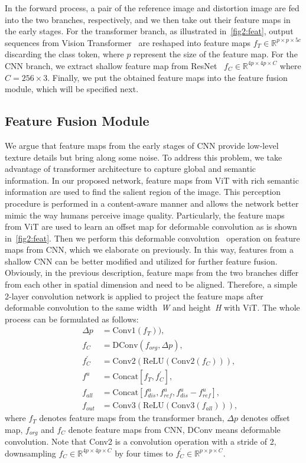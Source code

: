 \documentclass[10pt,twocolumn,letterpaper]{article}
\begin{document}
In the forward process, a pair of the reference image and distortion image are fed into the two branches, respectively, and we then take out their feature maps in the early stages. For the transformer branch, as illustrated in~\cref{fig2:feat}, output sequences from Vision Transformer~\cite{dosovitskiy2020image} are reshaped into feature maps $f_{T}\in \mathbb{R}^{p\times p \times 5c}$ discarding the class token, where $p$ represent the size of the feature map. For the CNN branch, we extract shallow feature map from ResNet~\cite{he2016deep} $f_{C}\in \mathbb{R}^{4p\times 4p \times C}$ where $C=256\times 3$. Finally, we put the obtained feature maps into the feature fusion module, which will be specified next.
 

\subsection{Feature Fusion Module}
\label{subsec:fusion}
We argue that feature maps from the early stages of CNN provide low-level texture details but bring along some noise. To address this problem, we take advantage of transformer architecture to capture global and semantic information. In our proposed network, feature maps from ViT with rich semantic information are used to find the salient region of the image. This perception procedure is performed in a content-aware manner and allows the network better mimic the way humans perceive image quality. Particularly, the feature maps from ViT are used to learn an offset map for deformable convolution as is shown in~\cref{fig2:feat}. Then we perform this deformable convolution~\cite{dai2017deformable} operation on feature maps from CNN, which we elaborate on previously. In this way, features from a shallow CNN can be better modified and utilized for further feature fusion. Obviously, in the previous description, feature maps from the two branches differ from each other in spatial dimension and need to be aligned. Therefore, a simple 2-layer convolution network is applied to project the feature maps after deformable convolution to the same width~\textit{W} and height~\textit{H} with ViT. The whole process can be formulated as follows:
\begin{align}
    && \Delta p &= \text{Conv1}(f_{T})), \\
    &&  f_{C} &= \text{DConv}(f_{org},\Delta p), \\
    &&  f_{C}^{'} &= \text{Conv2}(\text{ReLU}(\text{Conv2}(f_{C}))),   \\
    &&  f^{u} &= \text{Concat}[f_{T},f_{C}^{'}],   \\
    &&  f_{all} &= \text{Concat}[f^{u}_{dis},f^{u}_{ref},f^{u}_{dis}-f^{u}_{ref}],  \\
    &&  f_{out} &= \text{Conv3}(\text{ReLU}(\text{Conv3}(f_{all}))),
\end{align}
where $f_T$ denotes feature maps from the transformer branch, $\Delta p$ denotes offset map, $f_{org}$ and $f_C$ denote feature maps from CNN, DConv means deformable convolution. Note that Conv2 is a convolution operation with a stride of 2, downsampling $f_C \in \mathbb{R}^{4p \times 4p \times C}$ by four times to $f_C^{'} \in \mathbb{R}^{p \times p \times C}$. 
\end{document}
